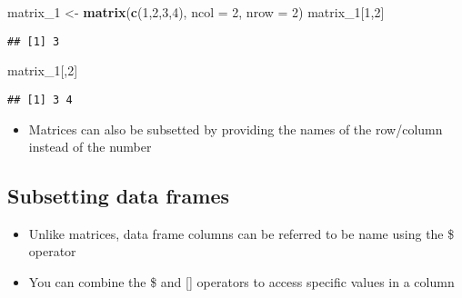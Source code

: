 \documentclass[]{article}
\newenvironment{Shaded}{\begin{snugshade}}{\end{snugshade}}
\newcommand{\KeywordTok}[1]{\textcolor[rgb]{0.13,0.29,0.53}{\textbf{#1}}}
\newcommand{\DataTypeTok}[1]{\textcolor[rgb]{0.13,0.29,0.53}{#1}}
\newcommand{\DecValTok}[1]{\textcolor[rgb]{0.00,0.00,0.81}{#1}}
\newcommand{\StringTok}[1]{\textcolor[rgb]{0.31,0.60,0.02}{#1}}
\newcommand{\OtherTok}[1]{\textcolor[rgb]{0.56,0.35,0.01}{#1}}
\newcommand{\OperatorTok}[1]{\textcolor[rgb]{0.81,0.36,0.00}{\textbf{#1}}}
\newcommand{\NormalTok}[1]{#1}
\providecommand{\tightlist}{%
  \setlength{\itemsep}{0pt}\setlength{\parskip}{0pt}}
\begin{document}
\begin{Shaded}
\begin{Highlighting}[]
\NormalTok{matrix_}\DecValTok{1}\NormalTok{ <-}\StringTok{ }\KeywordTok{matrix}\NormalTok{(}\KeywordTok{c}\NormalTok{(}\DecValTok{1}\NormalTok{,}\DecValTok{2}\NormalTok{,}\DecValTok{3}\NormalTok{,}\DecValTok{4}\NormalTok{), }\DataTypeTok{ncol =} \DecValTok{2}\NormalTok{, }\DataTypeTok{nrow =} \DecValTok{2}\NormalTok{)}
\NormalTok{matrix_}\DecValTok{1}\NormalTok{[}\DecValTok{1}\NormalTok{,}\DecValTok{2}\NormalTok{]}
\end{Highlighting}
\end{Shaded}

\begin{verbatim}
## [1] 3
\end{verbatim}

\begin{Shaded}
\begin{Highlighting}[]
\NormalTok{matrix_}\DecValTok{1}\NormalTok{[,}\DecValTok{2}\NormalTok{]}
\end{Highlighting}
\end{Shaded}

\begin{verbatim}
## [1] 3 4
\end{verbatim}

\begin{itemize}
\tightlist
\item
  Matrices can also be subsetted by providing the names of the
  row/column instead of the number
\end{itemize}

\subsection{Subsetting data frames}\label{subsetting-data-frames}

\begin{itemize}
\tightlist
\item
  Unlike matrices, data frame columns can be referred to be name using
  the \$ operator
\item
  You can combine the \$ and {[}{]} operators to access specific values
  in a column
\end{itemize}

\begin{Shaded}
\end{Shaded}
\end{document}
